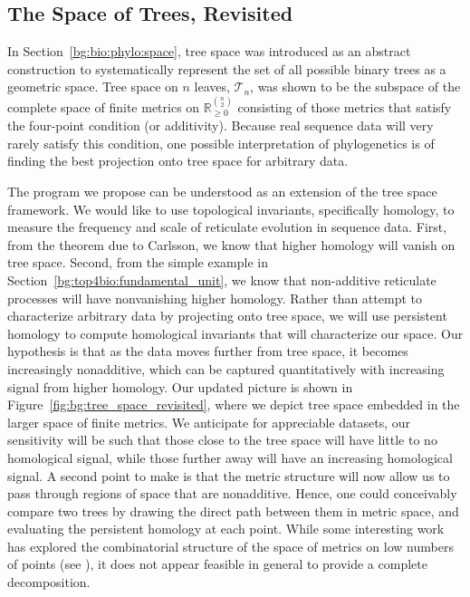 \subsection{The Space of Trees, Revisited}
\label{bg:top4bio:tree_space}

In Section~\ref{bg:bio:phylo:space}, tree space was introduced as an abstract construction to systematically represent the set of all possible binary trees as a geometric space.
Tree space on $n$ leaves, $\mathcal{T}_n$, was shown to be the subspace of the complete space of finite metrics on $\mathbb{R}^{\binom{n}{2}}_{\geq 0}$ consisting of those metrics that satisfy the four-point condition (or additivity).
Because real sequence data will very rarely satisfy this condition, one possible interpretation of phylogenetics is of finding the best projection onto tree space for arbitrary data.

The program we propose can be understood as an extension of the tree space framework.
We would like to use topological invariants, specifically homology, to measure the frequency and scale of reticulate evolution in sequence data.
First, from the theorem due to Carlsson, we know that higher homology will vanish on tree space.
Second, from the simple example in Section~\ref{bg:top4bio:fundamental_unit}, we know that non-additive reticulate processes will have nonvanishing higher homology.
Rather than attempt to characterize arbitrary data by projecting onto tree space, we will use persistent homology to compute homological invariants that will characterize our space.
Our hypothesis is that as the data moves further from tree space, it becomes increasingly nonadditive, which can be captured quantitatively with increasing signal from higher homology.
Our updated picture is shown in Figure~\ref{fig:bg:tree_space_revisited}, where we depict tree space embedded in the larger space of finite metrics.
We anticipate for appreciable datasets, our sensitivity will be such that those close to the tree space will have little to no homological signal, while those further away will have an increasing homological signal.
A second point to make is that the metric structure will now allow us to pass through regions of space that are nonadditive.
Hence, one could conceivably compare two trees by drawing the direct path between them in metric space, and evaluating the persistent homology at each point.
While some interesting work has explored the combinatorial structure of the space of metrics on low numbers of points (see \cite{Sturmfels:2004vc}), it does not appear feasible in general to provide a complete decomposition.

